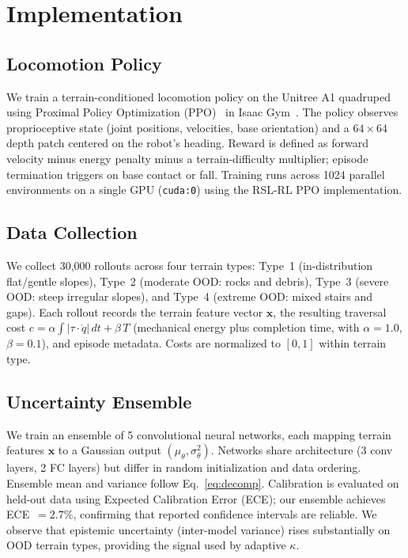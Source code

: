 \documentclass[letterpaper, 10pt, conference]{ieeeconf}
\begin{document}
\section{Implementation}
\label{sec:impl}

\subsection{Locomotion Policy}
We train a terrain-conditioned locomotion policy on the Unitree A1 quadruped
using Proximal Policy Optimization (PPO)~\cite{schulman2017proximal} in
Isaac Gym~\cite{makoviychuk2021isaac}.  The policy observes proprioceptive
state (joint positions, velocities, base orientation) and a $64\times64$ depth
patch centered on the robot's heading.  Reward is defined as forward velocity
minus energy penalty minus a terrain-difficulty multiplier; episode termination
triggers on base contact or fall.  Training runs across 1024 parallel
environments on a single GPU (\texttt{cuda:0}) using the RSL-RL PPO
implementation.

\subsection{Data Collection}
We collect 30{,}000 rollouts across four terrain types: Type~1 (in-distribution
flat/gentle slopes), Type~2 (moderate OOD: rocks and debris), Type~3 (severe
OOD: steep irregular slopes), and Type~4 (extreme OOD: mixed stairs and gaps).
Each rollout records the terrain feature vector $\mathbf{x}$, the resulting
traversal cost $c = \alpha \int |\tau \cdot \dot{q}|\, dt + \beta\, T$
(mechanical energy plus completion time, with $\alpha = 1.0$, $\beta = 0.1$),
and episode metadata.  Costs are normalized to $[0,1]$ within terrain type.

\subsection{Uncertainty Ensemble}
We train an ensemble of 5 convolutional neural networks, each mapping terrain
features $\mathbf{x}$ to a Gaussian output $(\mu_\theta, \sigma^2_\theta)$.
Networks share architecture (3 conv layers, 2 FC layers) but differ in random
initialization and data ordering.  Ensemble mean and variance follow
Eq.~\ref{eq:decomp}.  Calibration is evaluated on held-out data using Expected
Calibration Error (ECE); our ensemble achieves ECE~$= 2.7\%$, confirming that
reported confidence intervals are reliable.  We observe that epistemic
uncertainty (inter-model variance) rises substantially on OOD terrain types,
providing the signal used by adaptive $\kappa$.
\end{document}
